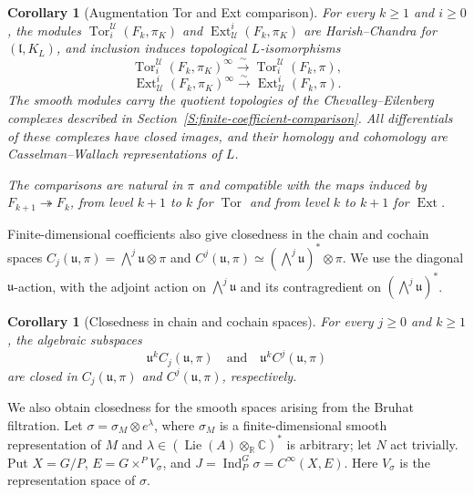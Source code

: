 \documentclass[a4paper,12pt]{amsart}
\numberwithin{equation}{section}
\theoremstyle{plain}
\newtheorem{corollary}[theorem]{Corollary}
\theoremstyle{definition}
\theoremstyle{remark}
\begin{document}
\begin{corollary}[Augmentation Tor and Ext comparison]\label{C:augmentation-comparison}\label{C:augmentation-Tor-comparison}\label{C:augmentation-Ext-comparison}
For every $k\geq1$ and $i\geq0$, the modules $\operatorname{Tor}_i^{\mathscr U}(F_k,\pi_K)$ and $\operatorname{Ext}^i_{\mathscr U}(F_k,\pi_K)$ are Harish--Chandra for $(\mathfrak l,K_L)$, and inclusion induces topological $L$-isomorphisms
\begin{equation}\label{Eq:augmentation-Tor-comparison}
 \operatorname{Tor}_i^{\mathscr U}(F_k,\pi_K)^\infty
 \xrightarrow{\ \sim\ }
 \operatorname{Tor}_i^{\mathscr U}(F_k,\pi),
\end{equation}
\begin{equation}\label{Eq:augmentation-Ext-comparison}
 \operatorname{Ext}^i_{\mathscr U}(F_k,\pi_K)^\infty
 \xrightarrow{\ \sim\ }
 \operatorname{Ext}^i_{\mathscr U}(F_k,\pi).
\end{equation}
The smooth modules carry the quotient topologies of the Chevalley--Eilenberg complexes described in Section~\ref{S:finite-coefficient-comparison}.
All differentials of these complexes have closed images, and their homology and cohomology are Casselman--Wallach representations of $L$.

The comparisons are natural in $\pi$ and compatible with the maps induced by $F_{k+1}\twoheadrightarrow F_k$, from level $k+1$ to $k$ for $\operatorname{Tor}$ and from level $k$ to $k+1$ for $\operatorname{Ext}$.
\end{corollary}

Finite-dimensional coefficients also give closedness in the chain and cochain spaces $C_j(\mathfrak u,\pi)=\bigwedge^j\mathfrak u\otimes\pi$ and $C^j(\mathfrak u,\pi)\simeq(\bigwedge^j\mathfrak u)^*\otimes\pi$.
We use the diagonal $\mathfrak u$-action, with the adjoint action on $\bigwedge^j\mathfrak u$ and its contragredient on $(\bigwedge^j\mathfrak u)^*$.

\begin{corollary}[Closedness in chain and cochain spaces]\label{C:Koszul-component-closedness}
For every $j\geq0$ and $k\geq1$, the algebraic subspaces
\[
 \mathfrak u^k C_j(\mathfrak u,\pi)
 \quad\text{and}\quad
 \mathfrak u^k C^j(\mathfrak u,\pi)
\]
are closed in $C_j(\mathfrak u,\pi)$ and $C^j(\mathfrak u,\pi)$, respectively.
\end{corollary}

We also obtain closedness for the smooth spaces arising from the Bruhat filtration.
Let $\sigma=\sigma_M\otimes e^\lambda$, where $\sigma_M$ is a finite-dimensional smooth representation of $M$ and $\lambda\in(\operatorname{Lie}(A)\otimes_{\mathbb R}\mathbb C)^*$ is arbitrary; let $N$ act trivially.
Put $X=G/P$, $E=G\times^P V_\sigma$, and $J=\operatorname{Ind}_P^G\sigma=C^\infty(X,E)$.
Here $V_\sigma$ is the representation space of $\sigma$.
\end{document}
